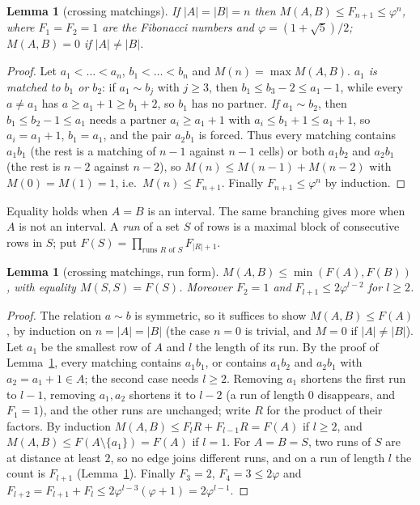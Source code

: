 \documentclass[11pt]{amsart}
\newtheorem{lemma}[theorem]{Lemma}
\theoremstyle{definition}
\theoremstyle{remark}
\begin{document}
\begin{lemma}[crossing matchings]\label{lem:fib}
If $|A| = |B| = n$ then $M(A, B) \le F_{n+1} \le \varphi^n$, where $F_1 = F_2 = 1$ are the
Fibonacci numbers and $\varphi = (1 + \sqrt 5)/2$; $M(A, B) = 0$ if $|A| \ne |B|$.
\end{lemma}
\begin{proof}
Let $a_1 < \dots < a_n$, $b_1 < \dots < b_n$ and $M(n) = \max M(A, B)$. \emph{$a_1$ is matched to
$b_1$ or $b_2$}: if $a_1 \sim b_j$ with $j \ge 3$, then $b_1 \le b_3 - 2 \le a_1 - 1$, while every
$a \ne a_1$ has $a \ge a_1 + 1 \ge b_1 + 2$, so $b_1$ has no partner. \emph{If $a_1 \sim b_2$},
then $b_1 \le b_2 - 1 \le a_1$ needs a partner $a_i \ge a_1 + 1$ with $a_i \le b_1 + 1 \le a_1 + 1$,
so $a_i = a_1 + 1$, $b_1 = a_1$, and the pair $a_2 b_1$ is forced. Thus every matching contains
$a_1 b_1$ (the rest is a matching of $n - 1$ against $n - 1$ cells) or both $a_1 b_2$ and
$a_2 b_1$ (the rest is $n-2$ against $n-2$), so $M(n) \le M(n-1) + M(n-2)$ with
$M(0) = M(1) = 1$, i.e.\ $M(n) \le F_{n+1}$. Finally $F_{n+1} \le \varphi^n$ by induction.
\end{proof}

Equality holds when $A = B$ is an interval. The same branching gives more when $A$ is not an
interval. A \emph{run} of a set $S$ of rows is a maximal block of consecutive rows in $S$; put
$F(S) = \prod_{\text{runs } R \text{ of } S} F_{|R|+1}$.

\begin{lemma}[crossing matchings, run form]\label{lem:runs}
$M(A, B) \le \min(F(A), F(B))$, with equality $M(S, S) = F(S)$. Moreover $F_2 = 1$ and
$F_{l+1} \le 2\varphi^{l-2}$ for $l \ge 2$.
\end{lemma}
\begin{proof}
The relation $a \sim b$ is symmetric, so it suffices to show $M(A, B) \le F(A)$, by induction on
$n = |A| = |B|$ (the case $n = 0$ is trivial, and $M = 0$ if $|A| \ne |B|$). Let $a_1$ be the
smallest row of $A$ and $l$ the length of its run. By the proof of Lemma~\ref{lem:fib}, every
matching contains $a_1 b_1$, or contains $a_1 b_2$ and $a_2 b_1$ with $a_2 = a_1 + 1 \in A$; the
second case needs $l \ge 2$. Removing $a_1$ shortens the first run to $l - 1$, removing $a_1, a_2$
shortens it to $l - 2$ (a run of length $0$ disappears, and $F_1 = 1$), and the other runs are
unchanged; write $R$ for the product of their factors. By induction
$M(A, B) \le F_l R + F_{l-1} R = F(A)$ if $l \ge 2$, and $M(A, B) \le F(A \setminus \{a_1\}) = F(A)$
if $l = 1$. For $A = B = S$, two runs of $S$ are at distance at least $2$, so no edge joins
different runs, and on a run of length $l$ the count is $F_{l+1}$ (Lemma~\ref{lem:fib}). Finally
$F_3 = 2$, $F_4 = 3 \le 2\varphi$ and $F_{l+2} = F_{l+1} + F_l \le 2\varphi^{l-3}(\varphi + 1) =
2\varphi^{l-1}$.
\end{proof}
\end{document}
